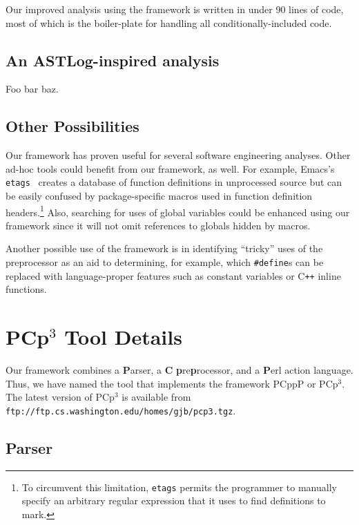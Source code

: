 \documentclass{article}
\newcommand{\B}{\discretionary{}{}{}}
\newcommand{\pcp}{\mbox{\textsf{PCp}$^3$}}
\newcommand{\pcppp}{\mbox{\textsf{PCppP}}}
\newcommand{\CPP}{\mbox{C\texttt{++}}}
\newcommand{\ppd}[1]{\texttt{\##1}}
\newcommand{\file}[1]{{\small \texttt{#1}}}
\begin{document}
Our improved analysis using the framework is written in under 90 lines
of code, most of which is the boiler-plate for handling all
conditionally-included code.

\subsection*{An ASTLog-inspired analysis}
\label{ssec:other_analysis}
\nopagebreak
Foo bar baz.

\subsection*{Other Possibilities}
\label{ssec:other_poss}

Our framework has proven useful for several software engineering
analyses.  Other ad-hoc tools could benefit from our framework, as well.
For example, Emacs's \texttt{etags}~\cite{GNUELisp} creates a database
of function definitions in unprocessed source but can be easily confused
by package-specific macros used in function definition headers.\footnote{To
circumvent this limitation, \texttt{etags} permits the programmer to manually specify an
arbitrary regular expression that it uses to find definitions to mark.}
Also, searching for uses of global variables could be enhanced using our
framework since it will not omit references to globals hidden by macros.

Another possible use of the framework is in identifying ``tricky'' uses
of the preprocessor as an aid to determining, for example, which
\ppd{define}s can be replaced with language-proper features such as
constant variables or \CPP{} inline functions.


\section*{\pcp{} Tool Details}
\label{sec:pcp3}

Our framework combines a
\textbf{\textsf{P}}arser, a \textbf{\textsf{C}}
\textbf{\textsf{p}}re\textbf{\textsf{p}}rocessor, and a
\textbf{\textsf{P}}erl action language.  Thus, we have named the tool
that implements the framework \pcppp{} or \pcp{}.
The latest version of \pcp{} is available from 
\file{ftp://\B{}ftp.\B{}cs.\B{}washington.\B{}edu/\B{}homes/\B{}gjb/\B{}pcp3.\B{}tgz}.

\subsection*{Parser}
\label{ssec:parser}
\end{document}

